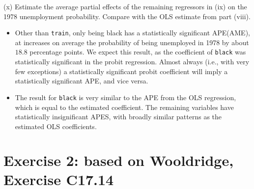 \documentclass[
  10pt,
  ignorenonframetext,
]{beamer}
\providecommand{\tightlist}{%
  \setlength{\itemsep}{0pt}\setlength{\parskip}{0pt}}
\begin{document}
\begin{frame}[fragile]{(x) Estimate the average partial effects of the
remaining regressors in (ix) on the 1978 unemployment probability.
Compare with the OLS estimate from part (viii).}
\protect\hypertarget{x-estimate-the-average-partial-effects-of-the-remaining-regressors-in-ix-on-the-1978-unemployment-probability.-compare-with-the-ols-estimate-from-part-viii.-1}{}
\begin{itemize}
\tightlist
\item
  Other than \texttt{train}, only being black has a statistically
  significant APE(AME), at increases on average the probability of being
  unemployed in 1978 by about \(18.8\) percentage points. We expect this
  result, as the coefficient of \texttt{black} was statistically
  significant in the probit regression. Almost always (i.e., with very
  few exceptions) a statistically significant probit coefficient will
  imply a statistically significant APE, and vice versa.
\end{itemize}

\vspace{2mm}

\begin{itemize}
\tightlist
\item
  The result for \texttt{black} is very similar to the APE from the OLS
  regression, which is equal to the estimated coefficient. The remaining
  variables have statistically insignificant APES, with broadly similar
  patterns as the estimated OLS coefficients.
\end{itemize}
\end{frame}

\hypertarget{exercise-2-based-on-wooldridge-exercise-c17.14}{%
\section{Exercise 2: based on Wooldridge, Exercise
C17.14}\label{exercise-2-based-on-wooldridge-exercise-c17.14}}
\end{document}

